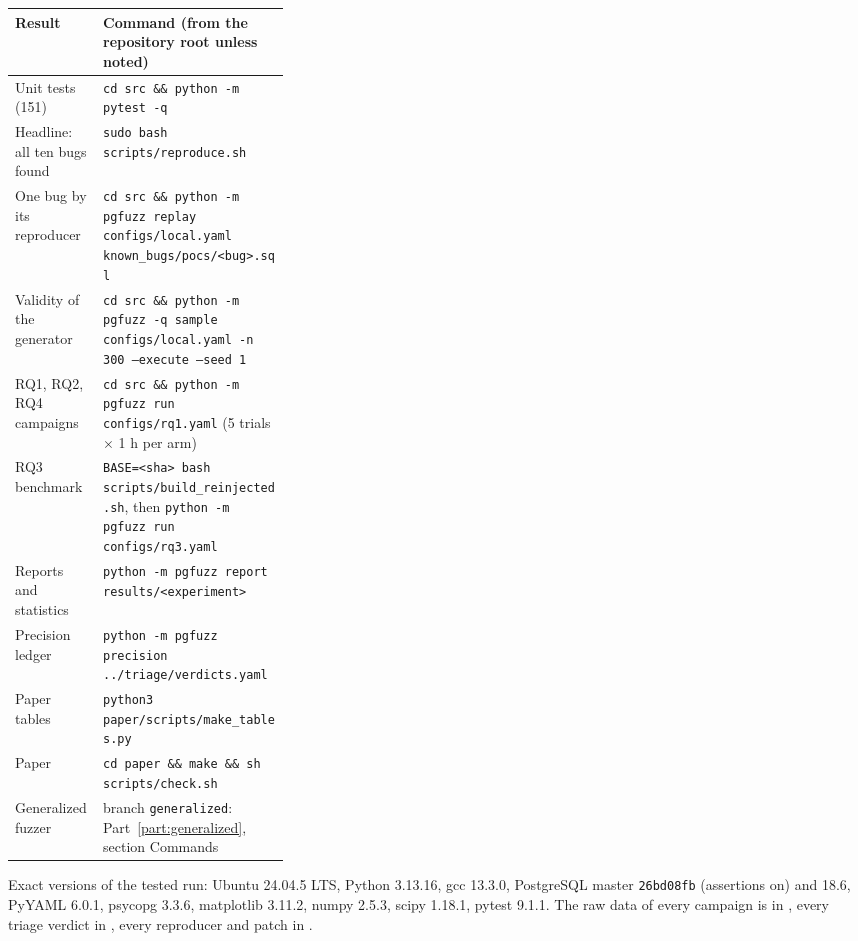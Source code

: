 \begin{center}
\small
\begin{tabularx}{\linewidth}{@{}p{0.32\linewidth}X@{}}
\toprule
Result & Command (from the repository root unless noted) \\
\midrule
Unit tests (151) & \texttt{cd src \&\& python -m pytest -q} \\
Headline: all ten bugs found & \texttt{sudo bash scripts/reproduce.sh} \\
One bug by its reproducer & \texttt{cd src \&\& python -m pgfuzz replay configs/local.yaml known\_bugs/pocs/<bug>.sql} \\
Validity of the generator & \texttt{cd src \&\& python -m pgfuzz -q sample configs/local.yaml -n 300 --execute --seed 1} \\
RQ1, RQ2, RQ4 campaigns & \texttt{cd src \&\& python -m pgfuzz run configs/rq1.yaml} (5 trials $\times$ 1 h per arm) \\
RQ3 benchmark & \texttt{BASE=<sha> bash scripts/build\_reinjected.sh}, then \texttt{python -m pgfuzz run configs/rq3.yaml} \\
Reports and statistics & \texttt{python -m pgfuzz report results/<experiment>} \\
Precision ledger & \texttt{python -m pgfuzz precision ../triage/verdicts.yaml} \\
Paper tables & \texttt{python3 paper/scripts/make\_tables.py} \\
Paper & \texttt{cd paper \&\& make \&\& sh scripts/check.sh} \\
Generalized fuzzer & branch \texttt{generalized}: Part~\ref{part:generalized}, section Commands \\
\bottomrule
\end{tabularx}
\end{center}

Exact versions of the tested run: Ubuntu 24.04.5 LTS, Python 3.13.16, gcc 13.3.0,
PostgreSQL master \texttt{26bd08fb} (assertions on) and 18.6, PyYAML 6.0.1,
psycopg 3.3.6, matplotlib 3.11.2, numpy 2.5.3, scipy 1.18.1, pytest 9.1.1. The
raw data of every campaign is in , every triage verdict in
, every reproducer and patch in .
